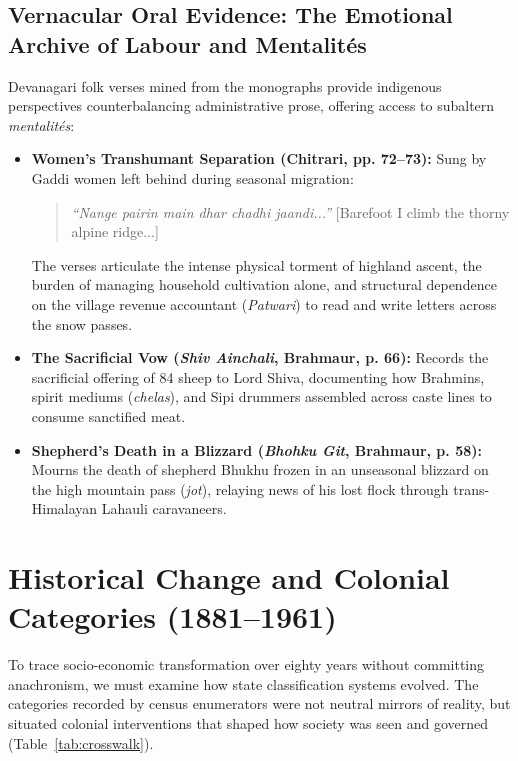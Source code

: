 \documentclass[11pt,a4paper]{article}
\begin{document}
\subsection{Vernacular Oral Evidence: The Emotional Archive of Labour and Mentalit\'es}
Devanagari folk verses mined from the monographs provide indigenous perspectives counterbalancing administrative prose, offering access to subaltern \textit{mentalit\'es}:
\begin{itemize}[leftmargin=*]
    \item \textbf{Women's Transhumant Separation (Chitrari, pp. 72--73):} Sung by Gaddi women left behind during seasonal migration:
    \begin{quote}
    \textit{``Nange pairin main dhar chadhi jaandi...''} [Barefoot I climb the thorny alpine ridge...]
    \end{quote}
    The verses articulate the intense physical torment of highland ascent, the burden of managing household cultivation alone, and structural dependence on the village revenue accountant (\textit{Patwari}) to read and write letters across the snow passes.
    \item \textbf{The Sacrificial Vow (\textit{Shiv Ainchali}, Brahmaur, p. 66):} Records the sacrificial offering of 84 sheep to Lord Shiva, documenting how Brahmins, spirit mediums (\textit{chelas}), and Sipi drummers assembled across caste lines to consume sanctified meat.
    \item \textbf{Shepherd's Death in a Blizzard (\textit{Bhohku Git}, Brahmaur, p. 58):} Mourns the death of shepherd Bhukhu frozen in an unseasonal blizzard on the high mountain pass (\textit{jot}), relaying news of his lost flock through trans-Himalayan Lahauli caravaneers.
\end{itemize}

\section{Historical Change and Colonial Categories (1881--1961)}

To trace socio-economic transformation over eighty years without committing anachronism, we must examine how state classification systems evolved. The categories recorded by census enumerators were not neutral mirrors of reality, but situated colonial interventions that shaped how society was seen and governed (Table~\ref{tab:crosswalk}).
\end{document}
